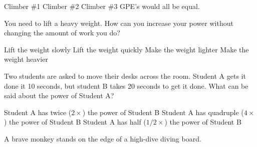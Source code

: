 \documentclass[answers,dvipsnames]{exam}
\begin{document}
\begin{questions}
\begin{minipage}{0.4\textwidth}
    \begin{randomizechoices}[norandomize]
        \choice Climber \#1
        \choice Climber \#2
        \choice Climber \#3
        \correctchoice GPE's would all be equal.
    \end{randomizechoices}
\end{minipage}%
\begin{minipage}{0.5\textwidth}
    \centering
\end{minipage}

\question 
You need to lift a heavy weight. How can you increase your power without changing the amount of work you do?

\begin{randomizechoices}[norandomize]
    \choice Lift the weight slowly
    \correctchoice Lift the weight quickly
    \choice Make the weight lighter
    \choice Make the weight heavier
\end{randomizechoices}

\question
Two students are asked to move their desks across the room. Student A gets it done it 10 seconds, but student B takes 20 seconds to get it done. What can be said about the power of Student A?

\begin{randomizechoices}[norandomize]
    \correctchoice Student A has twice ($2\times$) the power of Student B
    \choice Student A has quadruple ($4\times$) the power of Student B
    \choice Student A has half ($1/2\times$) the power of Student B    
\end{randomizechoices}


\question
A brave monkey stands on the edge of a high-dive diving board.


\end{questions}
\end{document}
